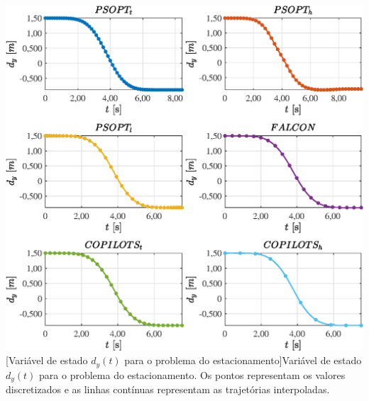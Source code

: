 \noindent
\begin{minipage}{\textwidth}
	\vspace{\onelineskip}
	\centering
	\includegraphics[scale=0.7]{fig/resultados/estacionamento/traj/x/d_y}
	[Variável de estado $d_y(t)$ para o problema do estacionamento]{Variável de estado $d_y(t)$ para o problema do estacionamento. Os pontos representam os valores discretizados e as linhas contínuas representam as trajetórias interpoladas.}
	\label{fig:estacionamento:x:d_y}
	\vspace{\onelineskip}
\end{minipage}

